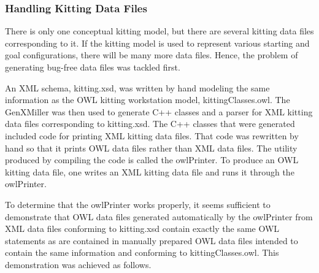 \subsubsection{Handling Kitting Data Files}
There is only one conceptual kitting model, but there are several kitting
data files corresponding to it. If the kitting model is used to represent
various starting and goal configurations, there
will be many more data files. Hence, the problem of generating bug-free
data files was tackled first.

An XML schema, kitting.xsd, was written by hand modeling the same
information as the OWL kitting workstation model, kittingClasses.owl. The
GenXMiller was then used to generate C++ classes and a parser for XML
kitting data files corresponding to kitting.xsd. The C++ classes that were
generated included code for printing XML kitting data
files. That code was rewritten by hand so that it prints OWL data files
rather than XML data files. The utility produced by compiling the code is
called the owlPrinter. To produce an OWL kitting data file, one writes an
XML kitting data file and runs it through the owlPrinter.

To determine that the owlPrinter works properly, it seems sufficient to
demonstrate that OWL data files generated automatically by the owlPrinter
from XML data files conforming to kitting.xsd contain exactly the same OWL
statements as are contained in manually prepared OWL data files intended to
contain the same information and conforming to kittingClasses.owl. This
demonstration was achieved as follows.

